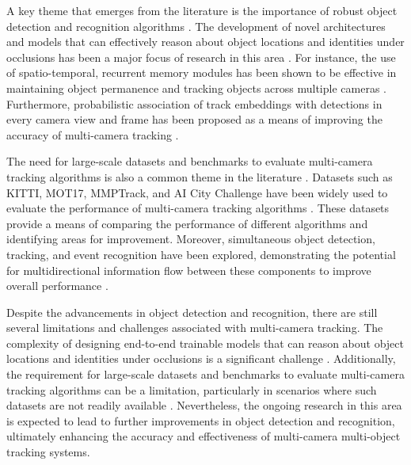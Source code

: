 \documentclass[conference]{IEEEtran}
\begin{document}
A key theme that emerges from the literature is the importance of robust object detection and recognition algorithms \cite{Detection, Recognition, and Tracking: A Survey}. The development of novel architectures and models that can effectively reason about object locations and identities under occlusions has been a major focus of research in this area \cite{Learning to Track with Object Permanence}. For instance, the use of spatio-temporal, recurrent memory modules has been shown to be effective in maintaining object permanence and tracking objects across multiple cameras \cite{Learning to Track with Object Permanence}. Furthermore, probabilistic association of track embeddings with detections in every camera view and frame has been proposed as a means of improving the accuracy of multi-camera tracking \cite{MCTR: Multi Camera Tracking Transformer}.

The need for large-scale datasets and benchmarks to evaluate multi-camera tracking algorithms is also a common theme in the literature \cite{Challenge of Multi-Camera Tracking}. Datasets such as KITTI, MOT17, MMPTrack, and AI City Challenge have been widely used to evaluate the performance of multi-camera tracking algorithms \cite{MCTR: Multi Camera Tracking Transformer}. These datasets provide a means of comparing the performance of different algorithms and identifying areas for improvement. Moreover, simultaneous object detection, tracking, and event recognition have been explored, demonstrating the potential for multidirectional information flow between these components to improve overall performance \cite{Simultaneous Object Detection, Tracking, and Event Recognition}.

Despite the advancements in object detection and recognition, there are still several limitations and challenges associated with multi-camera tracking. The complexity of designing end-to-end trainable models that can reason about object locations and identities under occlusions is a significant challenge \cite{Learning to Track with Object Permanence}. Additionally, the requirement for large-scale datasets and benchmarks to evaluate multi-camera tracking algorithms can be a limitation, particularly in scenarios where such datasets are not readily available \cite{Challenge of Multi-Camera Tracking}. Nevertheless, the ongoing research in this area is expected to lead to further improvements in object detection and recognition, ultimately enhancing the accuracy and effectiveness of multi-camera multi-object tracking systems.
\end{document}
